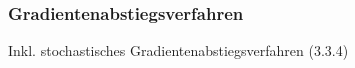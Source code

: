 \subsubsection{Gradientenabstiegsverfahren}
Inkl. stochastisches Gradientenabstiegsverfahren (3.3.4)